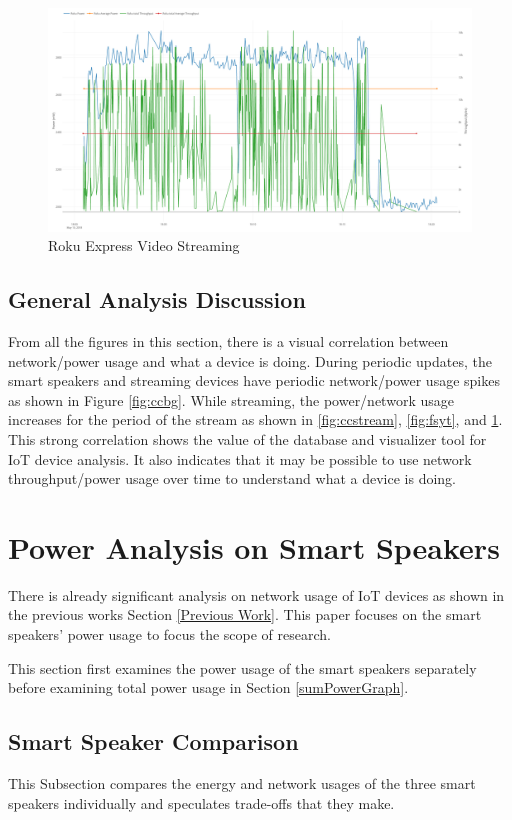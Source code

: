 \begin{figure}[H]
  \centering
  \includegraphics[width=1\textwidth]{figures/rokuStreaming.png}
  \caption{Roku Express Video Streaming}
  \label{fig:rokuStreaming}
\end{figure}

\subsection{General Analysis Discussion}
From all the figures in this section, there is a visual correlation between network/power usage and what a device is doing. During periodic updates, the smart speakers and streaming devices have periodic network/power usage spikes as shown in Figure \ref{fig:ccbg}. While streaming, the power/network usage increases for the period of the stream as shown in \ref{fig:ccstream}, \ref{fig:fsyt}, and \ref{fig:rokuStreaming}. This strong correlation shows the value of the database and visualizer tool for IoT device analysis. It also indicates that it may be possible to use network throughput/power usage over time to understand what a device is doing.

\section{Power Analysis on Smart Speakers}
\label{Power Analysis on Smart Speakers}
There is already significant analysis on network usage of IoT devices as shown in the previous works Section \ref{Previous Work}. This paper focuses on the smart speakers' power usage to focus the scope of research.

This section first examines the power usage of the smart speakers separately before examining total power usage in Section \ref{sumPowerGraph}.

\subsection{Smart Speaker Comparison}
\label{smartSpeakerComparisonSection}
This Subsection compares the energy and network usages of the three smart speakers individually and speculates trade-offs that they make.

